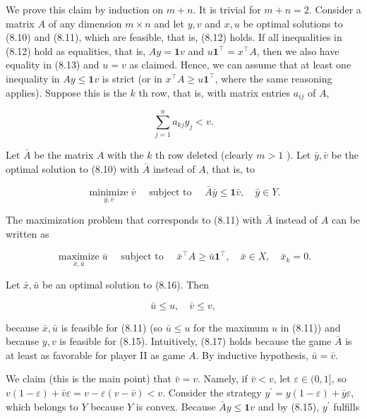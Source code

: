 \documentclass[12pt]{article}
\begin{document}
We prove this claim by induction on $m+n$. It is trivial for $m+n=2$. Consider a matrix $A$ of any dimension $m \times n$ and let $y, v$ and $x, u$ be optimal solutions to (8.10) and (8.11), which are feasible, that is, (8.12) holds. If all inequalities in (8.12) hold as equalities, that is, $A y=\mathbf{1} v$ and $u \mathbf{1}^{\top}=x^{\top} A$, then we also have equality in (8.13) and $u=v$ as claimed. Hence, we can assume that at least one inequality in $A y \leq \mathbf{1} v$ is strict (or in $x^{\top} A \geq u \mathbf{1}^{\top}$, where the same reasoning applies). Suppose this is the $k$ th row, that is, with matrix entries $a_{i j}$ of $A$,


\begin{equation*}
\sum_{j=1}^{n} a_{k j} y_{j}<v . \tag{8.14}
\end{equation*}


Let $\bar{A}$ be the matrix $A$ with the $k$ th row deleted (clearly $m>1$ ). Let $\bar{y}, \bar{v}$ be the optimal solution to (8.10) with $\bar{A}$ instead of $A$, that is, to


\begin{equation*}
\underset{\bar{y}, \bar{v}}{\operatorname{minimize}} \bar{v} \quad \text { subject to } \quad \bar{A} \bar{y} \leq \mathbf{1} \bar{v}, \quad \bar{y} \in Y . \tag{8.15}
\end{equation*}


The maximization problem that corresponds to (8.11) with $\bar{A}$ instead of $A$ can be written as


\begin{equation*}
\underset{\bar{x}, \bar{u}}{\operatorname{maximize}} \bar{u} \quad \text { subject to } \quad \bar{x}^{\top} A \geq \bar{u} \mathbf{1}^{\top}, \quad \bar{x} \in X, \quad \bar{x}_{k}=0 . \tag{8.16}
\end{equation*}


Let $\bar{x}, \bar{u}$ be an optimal solution to (8.16). Then


\begin{equation*}
\bar{u} \leq u, \quad \bar{v} \leq v, \tag{8.17}
\end{equation*}


because $\bar{x}, \bar{u}$ is feasible for (8.11) (so $\bar{u} \leq u$ for the maximum $u$ in (8.11)) and because $y, v$ is feasible for (8.15). Intuitively, (8.17) holds because the game $\bar{A}$ is at least as favorable for player II as game $A$. By inductive hypothesis, $\bar{u}=\bar{v}$.

We claim (this is the main point) that $\bar{v}=v$. Namely, if $\bar{v}<v$, let $\varepsilon \in(0,1]$, so $v(1-\varepsilon)+\bar{v} \varepsilon=v-\varepsilon(v-\bar{v})<v$. Consider the strategy $y^{\prime}=y(1-\varepsilon)+\bar{y} \varepsilon$, which belongs to $Y$ because $Y$ is convex. Because $\bar{A} y \leq \mathbf{1} v$ and by (8.15), $y^{\prime}$ fulfills
\end{document}
